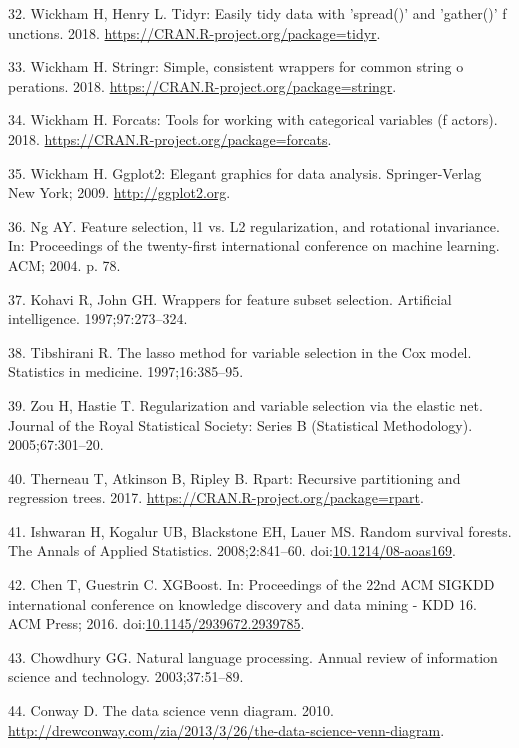 \documentclass[12pt,oneside]{reedthesis}
\theoremstyle{definition}
\theoremstyle{definition}
\theoremstyle{definition}
\theoremstyle{remark}
\begin{document}
\leavevmode\hypertarget{ref-tidyr_2018}{}%
32. Wickham H, Henry L. Tidyr: Easily tidy data with 'spread()' and
'gather()' f unctions. 2018.
\url{https://CRAN.R-project.org/package=tidyr}.

\leavevmode\hypertarget{ref-stringr_2018}{}%
33. Wickham H. Stringr: Simple, consistent wrappers for common string o
perations. 2018. \url{https://CRAN.R-project.org/package=stringr}.

\leavevmode\hypertarget{ref-forcats_2018}{}%
34. Wickham H. Forcats: Tools for working with categorical variables (f
actors). 2018. \url{https://CRAN.R-project.org/package=forcats}.

\leavevmode\hypertarget{ref-gglot2_2009}{}%
35. Wickham H. Ggplot2: Elegant graphics for data analysis.
Springer-Verlag New York; 2009. \url{http://ggplot2.org}.

\leavevmode\hypertarget{ref-Ng_2004}{}%
36. Ng AY. Feature selection, l1 vs. L2 regularization, and rotational
invariance. In: Proceedings of the twenty-first international conference
on machine learning. ACM; 2004. p. 78.

\leavevmode\hypertarget{ref-Kohavi_1997}{}%
37. Kohavi R, John GH. Wrappers for feature subset selection. Artificial
intelligence. 1997;97:273--324.

\leavevmode\hypertarget{ref-Tibshirani_1997}{}%
38. Tibshirani R. The lasso method for variable selection in the Cox
model. Statistics in medicine. 1997;16:385--95.

\leavevmode\hypertarget{ref-Zou_2005}{}%
39. Zou H, Hastie T. Regularization and variable selection via the
elastic net. Journal of the Royal Statistical Society: Series B
(Statistical Methodology). 2005;67:301--20.

\leavevmode\hypertarget{ref-rpart_2017}{}%
40. Therneau T, Atkinson B, Ripley B. Rpart: Recursive partitioning and
regression trees. 2017. \url{https://CRAN.R-project.org/package=rpart}.

\leavevmode\hypertarget{ref-Ishwaran_2008}{}%
41. Ishwaran H, Kogalur UB, Blackstone EH, Lauer MS. Random survival
forests. The Annals of Applied Statistics. 2008;2:841--60.
doi:\href{https://doi.org/10.1214/08-aoas169}{10.1214/08-aoas169}.

\leavevmode\hypertarget{ref-Chen_2016}{}%
42. Chen T, Guestrin C. XGBoost. In: Proceedings of the 22nd ACM SIGKDD
international conference on knowledge discovery and data mining - KDD
16. ACM Press; 2016.
doi:\href{https://doi.org/10.1145/2939672.2939785}{10.1145/2939672.2939785}.

\leavevmode\hypertarget{ref-Chowdhury_2003}{}%
43. Chowdhury GG. Natural language processing. Annual review of
information science and technology. 2003;37:51--89.

\leavevmode\hypertarget{ref-Conway_2010}{}%
44. Conway D. The data science venn diagram. 2010.
\url{http://drewconway.com/zia/2013/3/26/the-data-science-venn-diagram}.


\end{document}
